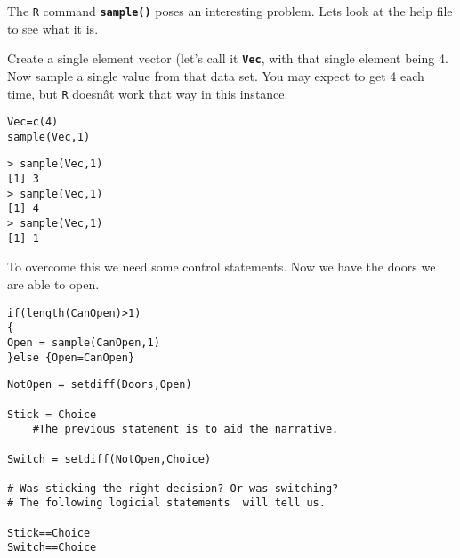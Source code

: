 \documentclass[a4paper,12pt]{article}
\begin{document}
The \texttt{R} command \texttt{\textbf{sample()}} poses an interesting problem. Lets look at the help file to see what it is.

Create a single element vector (let's call it \texttt{\textbf{Vec}}, with that single element being 4. Now sample a single value from that data set. You may expect to get 4 each time, but \texttt{R} doesnât work that way in this instance.

\begin{framed}
\begin{verbatim}
Vec=c(4)
sample(Vec,1)
\end{verbatim}
\end{framed}

\begin{verbatim}
> sample(Vec,1)
[1] 3
> sample(Vec,1)
[1] 4
> sample(Vec,1)
[1] 1
\end{verbatim}
To overcome this we need some control statements. Now we have the doors we are able to open.

\begin{framed}
\begin{verbatim}
if(length(CanOpen)>1)
{
Open = sample(CanOpen,1)
}else {Open=CanOpen}
\end{verbatim}
\end{framed}


\begin{framed}
\begin{verbatim}
NotOpen = setdiff(Doors,Open)

Stick = Choice
    #The previous statement is to aid the narrative.

Switch = setdiff(NotOpen,Choice)

# Was sticking the right decision? Or was switching?
# The following logicial statements  will tell us.

Stick==Choice
Switch==Choice
\end{verbatim}
\end{framed}
\end{document}
